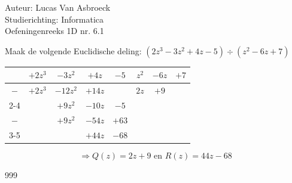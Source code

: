 \documentclass[a4paper]{article}
\begin{document}
\noindent \large Auteur: Lucas Van Asbroeck \\
\noindent \large Studierichting: Informatica\\
\noindent \large Oefeningenreeks 1D nr. 6.1\\

\medskip

\normalsize

Maak de volgende Euclidische deling: $(2z^3-3z^2+4z-5) \div (z^2 - 6z + 7)$\\

\begin{tabular}{c c c c c | c c c}
	& $+2z^3$ & $-3z^2$ & $+4z$ & $-5$ & 		$z^2$ & $-6z$ & $+7$ \\\hline
$-$ & $+2z^3$ & $-12z^2$& $+14z$&&				$2z$ & $+9$ \\\cline{2-4}
	&         & $+9z^2$ & $-10z$& $-5$ &		\\
$-$ &         & $+9z^2$ & $-54z$& $+63$&		 \\\cline{3-5} 
	&         &         & $+44z$& $-68$&		 &
\end{tabular}
\bigskip

$$\Rightarrow \boxed{Q(z) = 2z+9 \text{ en } R(z) = 44z - 68}$$

\begin{thebibliography}{999}
\end{thebibliography}
\end{document}
